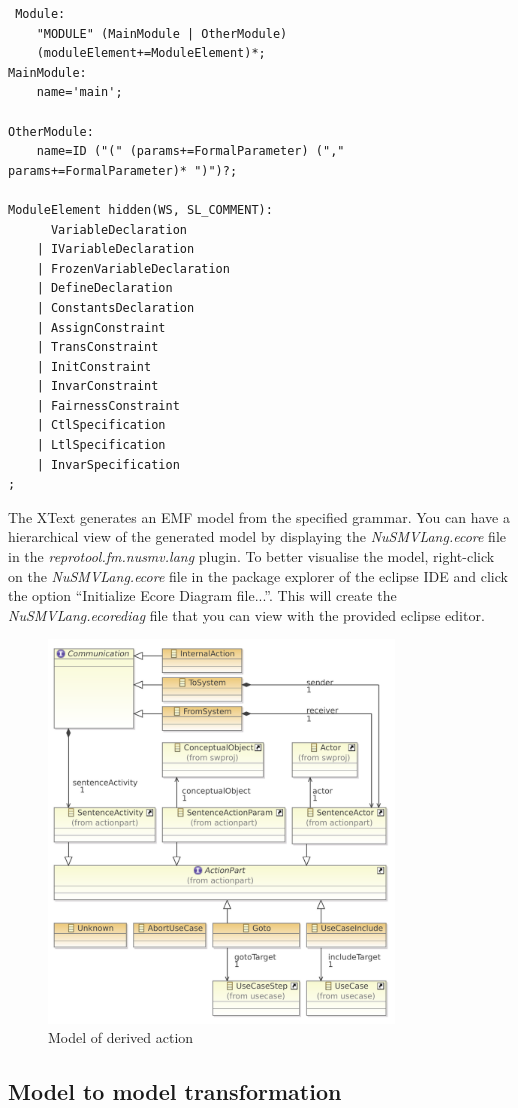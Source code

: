 \begin{lstlisting}
 Module:
	"MODULE" (MainModule | OtherModule)
	(moduleElement+=ModuleElement)*;
MainModule:
	name='main';

OtherModule:
	name=ID ("(" (params+=FormalParameter) ("," params+=FormalParameter)* ")")?;

ModuleElement hidden(WS, SL_COMMENT):
	  VariableDeclaration
	| IVariableDeclaration
	| FrozenVariableDeclaration
	| DefineDeclaration
	| ConstantsDeclaration
	| AssignConstraint
	| TransConstraint
	| InitConstraint
	| InvarConstraint
	| FairnessConstraint
	| CtlSpecification
	| LtlSpecification
	| InvarSpecification
;
\end{lstlisting}

The XText generates an EMF model from the specified grammar. You can have a hierarchical view of the generated model by displaying the
\emph{NuSMVLang.ecore} file in the \emph{reprotool.fm.nusmv.lang} plugin. To better visualise the model, right-click on the \emph{NuSMVLang.ecore} file in
the package explorer of the eclipse IDE and click the option ``Initialize Ecore Diagram file...''. This will create the \emph{NuSMVLang.ecorediag} file that you can view with the provided eclipse editor.

\begin{figure}
  \centering
  \includegraphics[width=260pt]{images/ReprotoolActionsModel}
  \caption{Model of derived action}
  \label{fig:ReprotoolActionsModel}
\end{figure}

\subsection{Model to model transformation}

